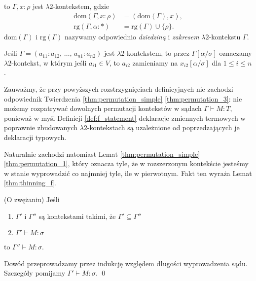\begin{definicja}
\begin{enumerate}[label=(E\arabic*), ref=(E\arabic*)]
\begin{enumerate}
    \end{enumerate}
      to \(\Gamma, x:\rho\) jest \(\lambda 2\)-kontekstem, gdzie 
      \begin{align*} 
        \mathrm{dom}(\Gamma, x:\rho)&=(\mathrm{dom}(\Gamma), x),\\
      \mathrm{rg}(\Gamma, \alpha:*)&=\mathrm{rg}(\Gamma)\cup\{\rho\}.
      \end{align*}
      \(\mathrm{dom}(\Gamma)\) i \(\mathrm{rg}(\Gamma)\) nazywamy odpowiednio \emph{dziedziną} i \emph{zakresem} \(\lambda 2\)-kontekstu \(\Gamma\).
  \end{enumerate}
    Jeśli \(\Gamma=(a_{11}: a_{12},\,\dots,\,a_{n1}:a_{n2})\) jest \(\lambda 2\)-kontekstem, to przez \(\Gamma[\alpha/\sigma]\) oznaczamy \(\lambda 2\)-kontekst, w którym jeśli \(a_{i1}\in V\), to \(a_{i2}\) zamieniamy na \(x_{i2}[\alpha/\sigma]\)  dla \(1\leq i \leq n\).
\end{definicja}

 \begin{uwaga*}
   Zauważmy, że przy powyższych rozstrzygnięciach definicyjnych nie zachodzi odpowiednik Twierdzenia \ref{thm:permutation_simple} \ref{thm:permutation_3}: nie możemy rozpatrywać dowolnych permutacji kontekstów w sądach \(\Gamma\vdash M:T\), ponieważ w myśl Definicji \ref{def:f_statement} deklaracje zmiennych termowych w poprawnie zbudowanych \(\lambda 2\)-kontekstach są uzależnione od poprzedzających je deklaracji typowych. 

   Naturalnie zachodzi natomiast Lemat \ref{thm:permutation_simple} \ref{thm:permutation_1}, który oznacza tyle, że w rozszerzonym kontekście jesteśmy w stanie wyprowadzić co najmniej tyle, ile w pierwotnym. Fakt ten wyraża Lemat \ref{thm:thinning_f}.
 \end{uwaga*}

\begin{lemat}(O zwężaniu)\label{thm:thinning_f}
      Jeśli \begin{enumerate}[label=(\alph*), ref=(\alph*)]
        \setlength\itemsep{0em}
        \item \(\Gamma'\) i \(\Gamma''\) są kontekstami takimi, że \(\Gamma' \subseteq \Gamma''\)
        \item \(\Gamma'\vdash M:\sigma\)
      \end{enumerate}
      to \(\Gamma''\vdash M:\sigma\).
\end{lemat}
\begin{dowod}
  Dowód przeprowadzamy przez indukcję względem długości wyprowadzenia sądu. Szczegóły pomijamy \(\Gamma'\vdash M:\sigma\).
  \qed
\end{dowod}

